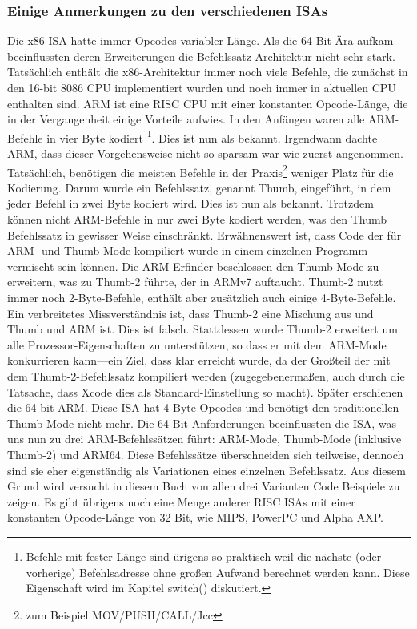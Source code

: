 %
%
%

\subsubsection{Einige Anmerkungen zu den verschiedenen \ac{ISA}s}
Die x86 \ac{ISA} hatte immer Opcodes variabler Länge. Als die 64-Bit-Ära aufkam beeinflussten deren Erweiterungen die Befehlssatz-Architektur
nicht sehr stark. Tatsächlich enthält die x86-Architektur immer noch viele Befehle, die zunächst in den 16-bit 8086 CPU implementiert
wurden und noch immer in aktuellen CPU enthalten sind.
ARM ist eine \ac{RISC} \ac{CPU} mit einer konstanten Opcode-Länge, die in der Vergangenheit einige Vorteile aufwies.
In den Anfängen waren alle ARM-Befehle in vier Byte kodiert%
\footnote{
Befehle mit fester Länge sind ürigens so praktisch weil die nächste (oder vorherige) 
Befehlsadresse ohne großen Aufwand berechnet werden kann. Diese Eigenschaft wird im Kapitel switch() diskutiert.}.
Dies ist nun als  bekannt.
Irgendwann dachte ARM, dass dieser Vorgehensweise nicht so sparsam war wie zuerst angenommen.
Tatsächlich, benötigen die meisten Befehle in der Praxis\footnote{zum Beispiel MOV/PUSH/CALL/Jcc} weniger Platz für die Kodierung.
Darum wurde ein Befehlssatz, genannt Thumb, eingeführt, in dem jeder Befehl in zwei Byte kodiert wird.
Dies ist nun als  bekannt.
Trotzdem können nicht  ARM-Befehle in nur zwei Byte kodiert werden, was den Thumb Befehlssatz in gewisser Weise einschränkt.
Erwähnenswert ist, dass Code der für ARM- und Thumb-Mode kompiliert wurde in einem einzelnen Programm vermischt sein können.
Die ARM-Erfinder beschlossen den Thumb-Mode zu erweitern, was zu Thumb-2 führte, der in ARMv7 auftaucht.
Thumb-2 nutzt immer noch 2-Byte-Befehle, enthält aber zusätzlich auch einige 4-Byte-Befehle.
Ein verbreitetes Missverständnis ist, dass Thumb-2 eine Mischung aus und Thumb und ARM ist. Dies ist falsch.
Stattdessen wurde Thumb-2 erweitert um alle Prozessor-Eigenschaften zu unterstützen, so dass er mit dem ARM-Mode konkurrieren kann---ein
Ziel, dass klar erreicht wurde, da der Großteil der \idevices mit dem Thumb-2-Befehlssatz kompiliert werden (zugegebenermaßen, auch durch
die Tatsache, dass Xcode dies als Standard-Einstellung so macht).
Später erschienen die 64-bit ARM. Diese \ac{ISA} hat 4-Byte-Opcodes und benötigt den traditionellen Thumb-Mode nicht mehr.
Die 64-Bit-Anforderungen beeinflussten die \ac{ISA}, was uns nun zu drei ARM-Befehlssätzen führt: ARM-Mode, Thumb-Mode (inklusive Thumb-2) und ARM64.
Diese Befehlssätze überschneiden sich teilweise, dennoch sind sie eher eigenständig als Variationen eines einzelnen Befehlssatz.
Aus diesem Grund wird versucht in diesem Buch von allen drei Varianten Code Beispiele zu zeigen.
%
%
%
Es gibt übrigens noch eine Menge anderer \ac{RISC} \ac{ISA}s mit einer konstanten Opcode-Länge von 32 Bit, wie MIPS, PowerPC und Alpha AXP.
